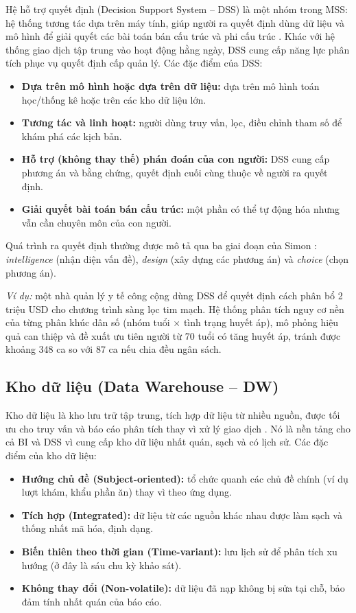 Hệ hỗ trợ quyết định (Decision Support System -- DSS) là một nhóm trong MSS: hệ thống tương tác dựa trên máy tính, giúp người ra quyết định dùng dữ liệu và mô hình để giải quyết các bài toán bán cấu trúc và phi cấu trúc \cite{turban2005,sharda2020}. Khác với hệ thống giao dịch tập trung vào hoạt động hằng ngày, DSS cung cấp năng lực phân tích phục vụ quyết định cấp quản lý. Các đặc điểm của DSS:
\begin{itemize}
\item \textbf{Dựa trên mô hình hoặc dựa trên dữ liệu:} dựa trên mô hình toán học/thống kê hoặc trên các kho dữ liệu lớn.
\item \textbf{Tương tác và linh hoạt:} người dùng truy vấn, lọc, điều chỉnh tham số để khám phá các kịch bản.
\item \textbf{Hỗ trợ (không thay thế) phán đoán của con người:} DSS cung cấp phương án và bằng chứng, quyết định cuối cùng thuộc về người ra quyết định.
\item \textbf{Giải quyết bài toán bán cấu trúc:} một phần có thể tự động hóa nhưng vẫn cần chuyên môn của con người.
\end{itemize}
Quá trình ra quyết định thường được mô tả qua ba giai đoạn của Simon \cite{simon1960}: \emph{intelligence} (nhận diện vấn đề), \emph{design} (xây dựng các phương án) và \emph{choice} (chọn phương án).

\emph{Ví dụ:} một nhà quản lý y tế công cộng dùng DSS để quyết định cách phân bổ 2 triệu USD cho chương trình sàng lọc tim mạch. Hệ thống phân tích nguy cơ nền của từng phân khúc dân số (nhóm tuổi $\times$ tình trạng huyết áp), mô phỏng hiệu quả can thiệp và đề xuất ưu tiên người từ 70 tuổi có tăng huyết áp, tránh được khoảng 348 ca so với 87 ca nếu chia đều ngân sách.

\subsection{Kho dữ liệu (Data Warehouse -- DW)}
Kho dữ liệu là kho lưu trữ tập trung, tích hợp dữ liệu từ nhiều nguồn, được tối ưu cho truy vấn và báo cáo phân tích thay vì xử lý giao dịch \cite{inmon2005,kimball2013}. Nó là nền tảng cho cả BI và DSS vì cung cấp kho dữ liệu nhất quán, sạch và có lịch sử. Các đặc điểm của kho dữ liệu:
\begin{itemize}
\item \textbf{Hướng chủ đề (Subject-oriented):} tổ chức quanh các chủ đề chính (ví dụ lượt khám, khẩu phần ăn) thay vì theo ứng dụng.
\item \textbf{Tích hợp (Integrated):} dữ liệu từ các nguồn khác nhau được làm sạch và thống nhất mã hóa, định dạng.
\item \textbf{Biến thiên theo thời gian (Time-variant):} lưu lịch sử để phân tích xu hướng (ở đây là sáu chu kỳ khảo sát).
\item \textbf{Không thay đổi (Non-volatile):} dữ liệu đã nạp không bị sửa tại chỗ, bảo đảm tính nhất quán của báo cáo.
\end{itemize}

